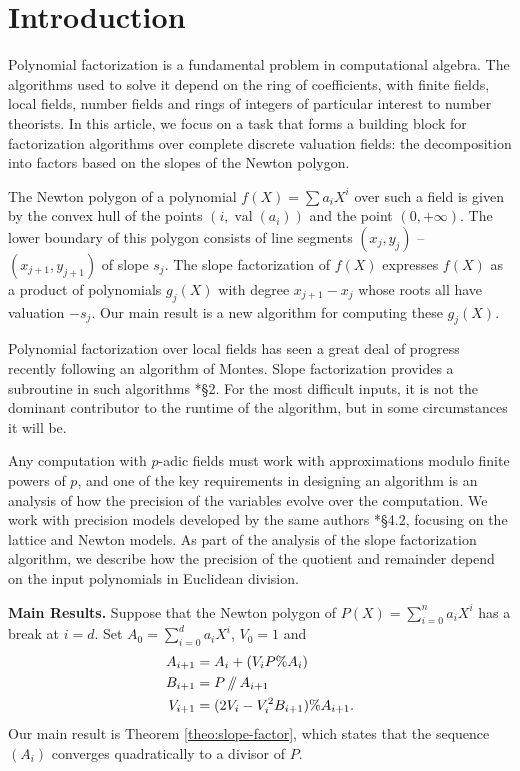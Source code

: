 \documentclass{sig-alternate-2013}
\DeclareMathOperator{\val}{val}
\renewcommand{\div}{\,/\hspace{-0.3em}/\,}
\begin{document}
\section{Introduction}

Polynomial factorization is a fundamental problem in computational algebra.
The algorithms used to solve it depend on the ring of coefficients, with finite fields,
local fields, number fields and rings of integers of particular interest to number theorists.
In this article, we focus on a task that forms a building block for factorization
algorithms over complete discrete valuation fields: the decomposition into factors based on the
slopes of the Newton polygon.

The Newton polygon of a polynomial $f(X) = \sum a_i X^i$ over such a field is given by
the convex hull of the points $(i, \val(a_i))$ and the point $(0, +\infty)$.  The lower
boundary of this polygon consists of line segments $(x_j,y_j)$ -- $(x_{j+1},y_{j+1})$
of slope $s_j$.  The slope factorization of $f(X)$ expresses $f(X)$ as a product
of polynomials $g_j(X)$ with degree $x_{j+1} - x_j$ whose roots all have valuation $-s_j$.
Our main result is a new algorithm for computing these $g_j(X)$.

Polynomial factorization over local fields has seen a great deal of progress recently
following an algorithm of Montes.  Slope factorization provides a subroutine
in such algorithms \cite{pauli:10a}*{\S 2}.  For the most difficult inputs, it is not the dominant
contributor to the runtime of the algorithm, but in some circumstances it will be.

Any computation with $p$-adic fields must work with approximations modulo finite
powers of $p$, and one of the key requirements in designing an algorithm is
an analysis of how the precision of the variables evolve over the computation.
We work with precision models developed by the same authors
\cite{caruso-roe-vaccon:14a}*{\S 4.2}, focusing on the lattice and Newton models.
As part of the analysis of the slope factorization algorithm, we describe
how the precision of the quotient and remainder depend on the input polynomials
in Euclidean division.

\medskip

\noindent
{\bf Main Results.}
%
Suppose that the Newton polygon of $P(X) = \sum_{i=0}^n a_i X^i$
has a break at $i=d$.  Set $A_0 = \sum_{i=0}^d a_i X^i$, $V_0 = 1$ and
\begin{align*}
A_{i+1} &= A_i + (V_i P \% A_i) \\
B_{i+1} &= P \div A_{i+1} \\
V_{i+1} &= (2V_i - V_i^2B_{i+1}) \% A_{i+1}.
\end{align*}
Our main result is Theorem \ref{theo:slope-factor},
which states that the sequence $(A_i)$ converges quadratically
to a divisor of $P$.
\end{document}
